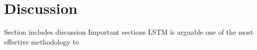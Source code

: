 \section{Discussion}
Section includes discussion
Important sections
LSTM is arguable one of the most effective methodology to 